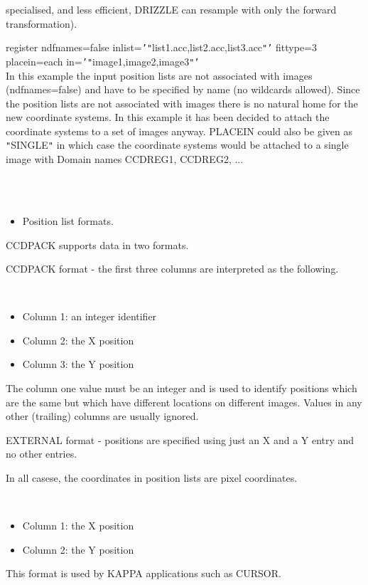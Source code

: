 \documentclass[twoside,11pt]{article}
\newcommand{\xref}[3]{#1}
\renewcommand{\_}{\texttt{\symbol{95}}}
\newcommand{\sstexamplesubsection}[2]{\sloppy \item{\ssttt #1} \mbox{} \\ #2 }
\newcommand{\sstnotes}[1]{\item[Notes:] \mbox{} \\[1.3ex] #1}
\newcommand{\sstitemlist}[1]{
  \mbox{} \\
  \vspace{-3.5ex}
  \begin{itemize}
     #1
  \end{itemize}
}
\newcommand{\sstitem}{\item}
\newcommand{\sstexamplesubsection}[2]{\item[{\ssttt #1}] #2}
\newcommand{\sstnotes}[1]{\item[Notes:] #1 }
\newcommand{\sstitemlist}[1]{
      \begin{itemize}
         #1
      \end{itemize}
      \\
   }
\newcommand{\sstitem}{\item}
\begin{document}
{{{         specialised, and less efficient, DRIZZLE can resample with
         only the forward transformation).
      }
      \sstexamplesubsection{
         register ndfnames=false inlist={\tt '}{\tt "}list1.acc,list2.acc,list3.acc{\tt "}{\tt '}
               fittype=3 placein=each in={\tt '}{\tt "}image1,image2,image3{\tt "}{\tt '}
      }{
         In this example the input position lists are not associated
         with images (ndfnames=false) and have to be specified by name
         (no wildcards allowed). Since the position lists are not
         associated with images there is no natural home for the
         new coordinate systems. In this example it has been decided to
         attach the coordinate systems to a set of images anyway.
         PLACEIN could also be given as {\tt "}SINGLE{\tt "} in which case the
         coordinate systems would be attached to a single image with
         Domain names CCD\_REG\_1, CCD\_REG\_2, ...
      }
   }
   \sstnotes{
      \sstitemlist{

         \sstitem
         Position list formats.

      }
        CCDPACK supports data in two formats.

        CCDPACK format - the first three columns are interpreted as the
        following.

      \sstitemlist{

         \sstitem
              Column 1: an integer identifier

         \sstitem
              Column 2: the X position

         \sstitem
              Column 3: the Y position

      }
        The column one value must be an integer and is used to identify
        positions which are the same but which have different locations
        on different images. Values in any other (trailing) columns are
        usually ignored.

        EXTERNAL format - positions are specified using just an X and
        a Y entry and no other entries.

        In all casese, the coordinates in position lists are pixel
        coordinates.

      \sstitemlist{

         \sstitem
              Column 1: the X position

         \sstitem
              Column 2: the Y position

      }
        This format is used by KAPPA applications such as
        \xref{CURSOR}{sun95}{CURSOR}.

}}
\end{document}
